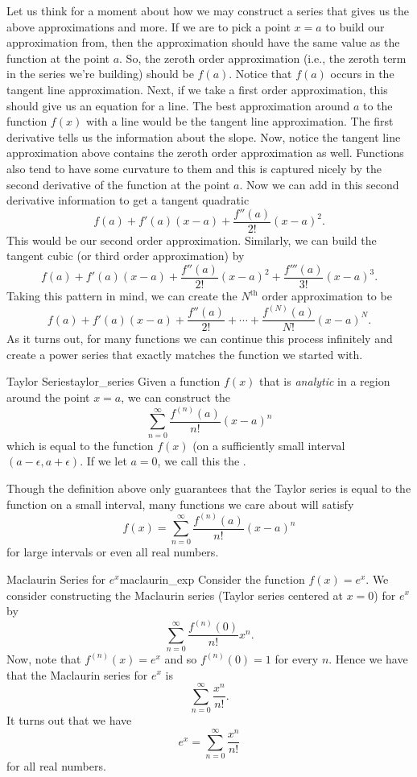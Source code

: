 Let us think for a moment about how we may construct a series that gives us the above approximations and more.  If we are to pick a point $x=a$ to build our approximation from, then the approximation should have the same value as the function at the point $a$.  So, the zeroth order approximation (i.e., the zeroth term in the series we're building) should be $f(a)$.  Notice that $f(a)$ occurs in the tangent line approximation.  Next, if we take a first order approximation, this should give us an equation for a line. The best approximation around $a$ to the function $f(x)$ with a line would be the tangent line approximation.  The first derivative tells us the information about the slope.  Now, notice the tangent line approximation above contains the zeroth order approximation as well. Functions also tend to have some curvature to them and this is captured nicely by the second derivative of the function at the point $a$.  Now we can add in this second derivative information to get a tangent quadratic
\[
f(a)+f'(a)(x-a)+\frac{f''(a)}{2!}(x-a)^2.
\]
This would be our second order approximation. Similarly, we can build the tangent cubic (or third order approximation) by
\[
f(a)+f'(a)(x-a)+\frac{f''(a)}{2!}(x-a)^2+\frac{f'''(a)}{3!}(x-a)^3.
\]
Taking this pattern in mind, we can create the $N^\textrm{th}$ order approximation to be
\[
f(a)+f'(a)(x-a)+\frac{f''(a)}{2!}+\cdots + \frac{f^{(N)}(a)}{N!}(x-a)^N.
\]
As it turns out, for many functions we can continue this process infinitely and create a power series that exactly matches the function we started with.

\begin{df}{Taylor Series}{taylor_series}
Given a function $f(x)$ that is \emph{analytic} in a region around the point $x=a$, we can construct the 
\[
\sum_{n=0}^\infty \frac{f^{(n)}(a)}{n!}(x-a)^n
\]
which is equal to the function $f(x)$ (on a sufficiently small interval $(a-\epsilon, a+\epsilon)$. If we let $a=0$, we call this the .  
\end{df}

Though the definition above only guarantees that the Taylor series is equal to the function on a small interval, many functions we care about will satisfy
\[
f(x)=\sum_{n=0}^\infty \frac{f^{(n)}(a)}{n!}(x-a)^n
\]
for large intervals or even all real numbers.  

\begin{ex}{Maclaurin Series for $e^x$}{maclaurin_exp}
Consider the function $f(x)=e^x$.  We consider constructing the Maclaurin series (Taylor series centered at $x=0$) for $e^x$ by
\[
\sum_{n=0}^\infty \frac{f^{(n)}(0)}{n!}x^n.
\]
Now, note that $f^{(n)}(x)=e^x$ and so $f^{(n)}(0)=1$ for every $n$.  Hence we have that the Maclaurin series for $e^x$ is
\[
\sum_{n=0}^\infty \frac{x^n}{n!}.
\]
It turns out that we have
\[
e^x = \sum_{n=0}^\infty \frac{x^n}{n!}
\]
for all real numbers.
\end{ex}

